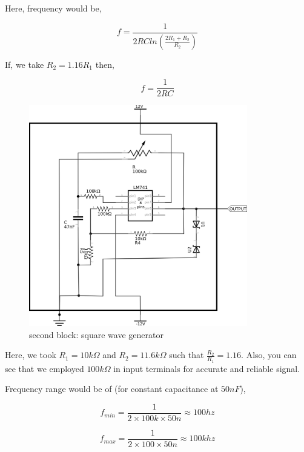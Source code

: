 \documentclass[12pt]{article}
\begin{document}
Here, frequency would be, 

\begin{equation}
\label{eq:org2eec199}
  f =\frac{1}{2 RC ln(\frac{2R_{1}+R_{2}}{R_{2}})}
\end{equation}

If, we take \(R_{2}=1.16R_{1}\) then, 

\begin{equation}
\label{eq:org66243eb}
  f =\frac{1}{2RC}
\end{equation}


\begin{figure}[H]
    \centering
    \label{squarereal}
    \includegraphics[width=0.85\textwidth]{imgs/squarereal.png}
    \caption{second block: square wave generator}
\end{figure}


Here, we took \(R_{1} = 10k\Omega\) and \(R_{2} = 11.6k\Omega\) such that \(\frac{R_{2}}{R_{1}}=1.16\). Also, you can see that we employed \(100k\Omega\) in input terminals for accurate and reliable signal.

Frequency range would be of (for constant capacitance at \(50nF\)),

\begin{equation*}
\label{eq:org18dad6a}
  f_{min} =\frac{1}{2\times 100k\times 50n} \approx 100 hz
\end{equation*}

\begin{equation*}
\label{eq:org40e8797}
  f_{max} =\frac{1}{2\times 100 \times 50n} \approx 100 khz
\end{equation*}
\end{document}
